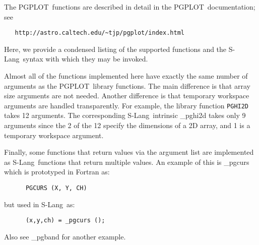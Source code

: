 \documentclass{book}
\newcommand{\pgplot}{{\sc PGPLOT}}
\newcommand{\slang}{{\sc S-Lang}}
\begin{document}
{The \pgplot\ functions are described in detail in the \pgplot\
documentation;  see
\begin{verbatim}
   http://astro.caltech.edu/~tjp/pgplot/index.html
\end{verbatim}
Here, we provide a condensed listing of the supported
functions and the \slang\ syntax with which they may be invoked.

Almost all of the functions implemented here have exactly the same
number of arguments as the \pgplot\ library functions.  The main
difference is that array size arguments are not needed.  Another
difference is that temporary workspace arguments are handled
transparently.  For example, the library function {\tt PGHI2D} takes
12 arguments.  The corresponding
\slang\  intrinsic \_pghi2d takes only 9 arguments since the 2 of the 12
specify the dimensions of a 2D array, and 1 is a temporary workspace argument.

Finally, some functions that return values via the argument list are
implemented as \slang\  functions that return multiple values.  An example
of this is \_pgcurs which is prototyped in {\sc Fortran} as:
\begin{verbatim}
      PGCURS (X, Y, CH)
\end{verbatim}
but used in \slang\  as:
\begin{verbatim}
      (x,y,ch) = _pgcurs ();
\end{verbatim}
Also see \_pgband for another example.

\vfill
\newpage

}
\end{document}
